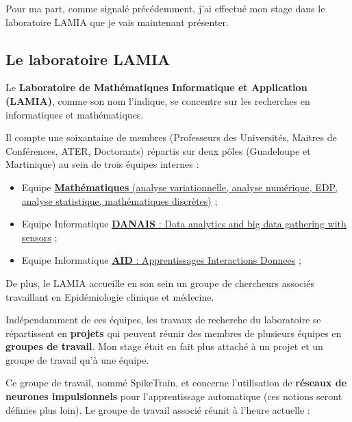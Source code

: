 Pour ma part, comme signalé précédemment, j'ai effectué mon stage dans
le laboratoire LAMIA que je vais maintenant présenter.

\hypertarget{le-lamia}{%
\subsection{Le laboratoire LAMIA}\label{le-lamia}}

Le \textbf{Laboratoire de Mathématiques Informatique et Application
(LAMIA)}, comme son nom l'indique, se concentre sur les recherches en
informatiques et mathématiques.

Il compte une soixantaine de membres (Professeurs des Universités,
Maitres de Conférences, ATER, Doctorants) répartis sur deux pôles
(Guadeloupe et Martinique) au sein de trois équipes internes :

\begin{itemize}
\tightlist
\item
  Equipe
  \href{http://lamia.univ-ag.fr/index.php?page=equipe-mathematiques}{\textbf{Mathématiques}
  (analyse variationnelle, analyse numérique, EDP, analyse statistique,
  mathématiques discrètes)} ;
\item
  Equipe Informatique
  \href{http://lamia.univ-ag.fr/index.php?page=equipe-danais}{\textbf{DANAIS}
  : Data analytics and big data gathering with sensors} ;
\item
  Equipe Informatique
  \href{http://lamia.univ-ag.fr/index.php?page=equipe-aid}{\textbf{AID}
  : Apprentissages Interactions Donnees} ;
\end{itemize}

De plus, le LAMIA accueille en son sein un groupe de chercheurs associés
travaillant en Epidémiologie clinique et médecine.


Indépendamment de ces équipes, les travaux de recherche du laboratoire
se répartissent en \textbf{projets} qui peuvent réunir des membres de
plusieurs équipes en \textbf{groupes de travail}. Mon stage était en
fait plus attaché à un projet et un groupe de travail qu'à une équipe.

Ce groupe de travail, nommé SpikeTrain,  et
concerne l'utilisation de \textbf{réseaux de neurones impulsionnels}
pour l'apprentissage automatique (ces notions seront définies plus
loin). Le groupe de travail associé réunit à l'heure actuelle :

